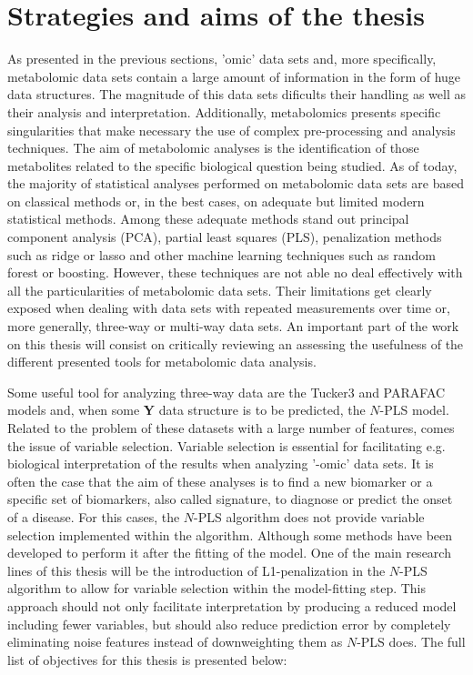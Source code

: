 \section{Strategies and aims of the thesis}
\label{sec:strategiesthesis}
As presented in the previous sections, 'omic' data sets and, more specifically, metabolomic data sets contain a large amount of information in the form of huge data structures. The magnitude of this data sets dificults their handling as well as their analysis and interpretation. Additionally, metabolomics presents specific singularities that make necessary the use of complex pre-processing and analysis techniques. The aim of metabolomic analyses is the identification of those metabolites related to the specific biological question being studied. As of today, the majority of statistical analyses performed on metabolomic data sets are based on classical methods or, in the best cases, on adequate but limited modern statistical methods. Among these adequate methods stand out principal component analysis (PCA), partial least squares (PLS), penalization methods such as ridge or lasso and other machine learning techniques such as random forest or boosting. However, these techniques are not able no deal effectively with all the particularities of metabolomic data sets. Their limitations get clearly exposed when dealing with data sets with repeated measurements over time or, more generally, three-way or multi-way data sets. An important part of the work on this thesis will consist on critically reviewing an assessing the usefulness of the different presented tools for metabolomic data analysis.

Some useful tool for analyzing three-way data are the Tucker3 and PARAFAC models and, when some \textbf{Y} data structure is to be predicted, the $N$-PLS model. Related to the problem of these datasets with a large number of features, comes the issue of variable selection. Variable selection is essential for facilitating e.g. biological interpretation of the results when analyzing '-omic' data sets. It is often the case that the aim of these analyses is to find a new biomarker or a specific set of biomarkers, also called signature, to diagnose or predict the onset of a disease. For this cases, the $N$-PLS algorithm does not provide variable selection implemented within the algorithm. Although some methods have been developed to perform it after the fitting of the model. One of the main research lines of this thesis will be the introduction of L1-penalization in the $N$-PLS algorithm to allow for variable selection within the model-fitting step. This approach should not only facilitate interpretation by producing a reduced model including fewer variables, but should also reduce prediction error by completely eliminating noise features instead of downweighting them as $N$-PLS does. 
The full list of objectives for this thesis is presented below:

